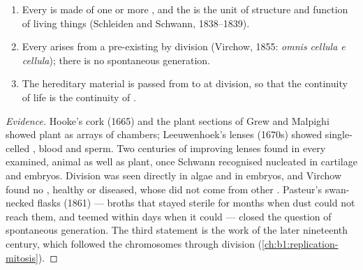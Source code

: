 \begin{proposition}\label{prop:b1:cell-unit-of-life:theory}
\begin{enumerate}
  \item Every  is made of one or more , and the  is
        the unit of structure and function of living things
        (Schleiden and Schwann, 1838--1839).
  \item Every  arises from a pre-existing  by division
        (Virchow, 1855: \emph{omnis cellula e cellula}); there is no
        spontaneous generation.
  \item The hereditary material is passed from  to  at
        division, so that the continuity of life is the continuity of
        .
\end{enumerate}
\end{proposition}
\begin{proof}[Evidence]
Hooke's cork (1665) and the plant sections of Grew and Malpighi showed
plant  as arrays of chambers; Leeuwenhoek's lenses (1670s) showed
single-celled , blood  and sperm. Two centuries of
improving lenses found  in every  examined, animal as well as
plant, once Schwann recognised nucleated  in cartilage and embryos.
Division was seen directly in algae and in embryos, and Virchow found
no , healthy or diseased, whose  did not come from other
. Pasteur's swan-necked flasks (1861) --- broths that stayed sterile
for months when dust could not reach them, and teemed within days when
it could --- closed the question of spontaneous generation. The third
statement is the work of the later nineteenth century, which followed
the chromosomes through division (\cref{ch:b1:replication-mitosis}).
\end{proof}

